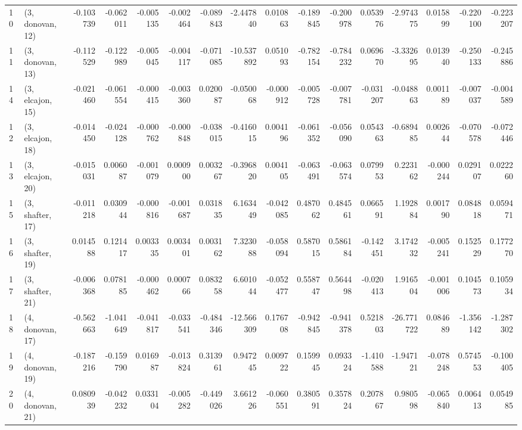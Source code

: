 \begin{tabular}{llrrrrrrrrrrrrrr}
10 &  (3, donovan, 12) & -0.103739 & -0.062011 &  -0.005135 & -0.002464 & -0.089843 &  -2.447840 &  0.010863 &  -0.189845 & -0.200978 &  0.053976 &  -2.974375 &  0.015899 & -0.220100 & -0.223207 \\
11 &  (3, donovan, 13) & -0.112529 & -0.122989 &  -0.005045 & -0.004117 & -0.071085 & -10.537892 &  0.051093 &  -0.782154 & -0.784232 &  0.069670 &  -3.332695 &  0.013940 & -0.250133 & -0.245886 \\
14 &  (3, elcajon, 15) & -0.021460 & -0.061554 &  -0.000415 & -0.003360 &  0.020087 &  -0.050068 & -0.000912 &  -0.005728 & -0.007781 & -0.031207 &  -0.048863 &  0.001189 & -0.007037 & -0.004589 \\
12 &  (3, elcajon, 18) & -0.014450 & -0.024128 &  -0.000762 & -0.000848 & -0.038015 &  -0.416015 &  0.004196 &  -0.061352 & -0.056090 &  0.054363 &  -0.689485 &  0.002644 & -0.070578 & -0.072446 \\
13 &  (3, elcajon, 20) & -0.015031 &  0.006087 &  -0.001079 &  0.000900 &  0.003267 &  -0.396820 &  0.004105 &  -0.063491 & -0.063574 &  0.079953 &   0.223162 & -0.000244 &  0.029107 &  0.022260 \\
15 &  (3, shafter, 17) & -0.011218 &  0.030944 &  -0.000816 & -0.001687 &  0.031835 &   6.163449 & -0.042085 &   0.487062 &  0.484561 &  0.066591 &   1.192884 &  0.001790 &  0.084818 &  0.059471 \\
16 &  (3, shafter, 19) &  0.014588 &  0.121417 &   0.003335 &  0.003401 &  0.003162 &   7.323088 & -0.058094 &   0.587015 &  0.586184 & -0.142451 &   3.174232 & -0.005241 &  0.152529 &  0.177270 \\
17 &  (3, shafter, 21) & -0.006368 &  0.078185 &  -0.000462 &  0.000766 &  0.083258 &   6.601044 & -0.052477 &   0.558747 &  0.564498 & -0.020413 &   1.916504 & -0.001006 &  0.104573 &  0.105934 \\
18 &  (4, donovan, 17) & -0.562663 & -1.041649 &  -0.041817 & -0.033541 & -0.484346 & -12.566309 &  0.176708 &  -0.942845 & -0.941378 &  0.521803 & -26.771722 &  0.084689 & -1.356142 & -1.287302 \\
19 &  (4, donovan, 19) & -0.187216 & -0.159790 &   0.016987 & -0.013824 &  0.313961 &   0.947245 &  0.009722 &   0.159945 &  0.093324 & -1.410588 &  -1.947121 & -0.078248 &  0.574553 & -0.100405 \\
20 &  (4, donovan, 21) &  0.080939 & -0.042232 &   0.033104 & -0.005282 & -0.449026 &   3.661226 & -0.060551 &   0.380591 &  0.357824 &  0.207867 &   0.980598 & -0.065840 &  0.006413 &  0.054985 \\

\end{tabular}
